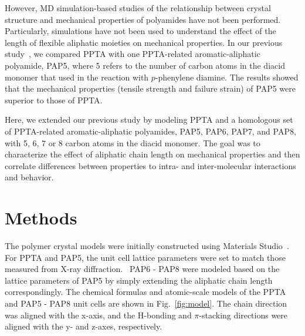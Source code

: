 \documentclass[journal=langd5,manuscript=article]{achemso}
\begin{document}
However, MD simulation-based studies of the relationship between crystal structure and mechanical properties of polyamides have not been performed.
Particularly, simulations have not been used to understand the effect of the length of flexible aliphatic moieties on mechanical properties.
In our previous study~\cite{yang2021molecular}, we compared PPTA with one PPTA-related aromatic-aliphatic polyamide, PAP5, where 5 refers to the number of carbon atoms in the diacid monomer that used in the reaction with $p$-phenylene diamine. 
The results showed that the mechanical properties (tensile strength and failure strain) of PAP5 were superior to those of PPTA.

Here, we extended our previous study by modeling PPTA and a homologous set of PPTA-related aromatic-aliphatic polyamides, PAP5, PAP6, PAP7, and PAP8, with 5, 6, 7 or 8 carbon atoms in the diacid monomer.
The goal was to characterize the effect of aliphatic chain length on mechanical properties and then correlate differences between properties to intra- and inter-molecular interactions and behavior.



\FloatBarrier
\section{Methods}

The polymer crystal models were initially constructed using Materials Studio~\cite{MaterialStudio}.
For PPTA and PAP5, the unit cell lattice parameters were set to match those measured from X-ray diffraction.~\cite{deshmukh2016conformational} 
PAP6 - PAP8 were modeled based on the lattice parameters of PAP5 by simply extending the aliphatic chain length correspondingly.
The chemical formulas and atomic-scale models of the PPTA and PAP5 - PAP8 unit cells are shown in Fig.~\ref{fig:model}. 
The chain direction was aligned with the x-axis, and the H-bonding and $\pi$-stacking directions were aligned with the y- and z-axes, respectively.
\end{document}
